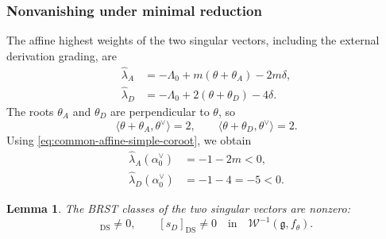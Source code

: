 \documentclass[11pt,reqno]{amsart}
\newtheorem{lemma}[theorem]{Lemma}
\theoremstyle{definition}
\theoremstyle{remark}
\begin{document}
\subsubsection{Nonvanishing under minimal reduction}


The affine highest weights of the two singular vectors, including the
external derivation grading, are
\begin{equation*}
\begin{aligned}
  \widehat\lambda_A
  &=
  -\Lambda_0
  +
  m(\theta+\theta_A)
  -
  2m\delta,\\
  \widehat\lambda_D
  &=
  -\Lambda_0
  +
  2(\theta+\theta_D)
  -
  4\delta.
\end{aligned}
\end{equation*}
The roots \(\theta_A\) and \(\theta_D\) are perpendicular to
\(\theta\), so
\begin{equation*}
  \langle\theta+\theta_A,\theta^\vee\rangle=2,
  \qquad
  \langle\theta+\theta_D,\theta^\vee\rangle=2.
\end{equation*}
Using \eqref{eq:common-affine-simple-coroot}, we obtain
\begin{equation}
\begin{aligned}
  \widehat\lambda_A(\alpha_0^\vee)
  &=
  -1-2m<0,\\
  \widehat\lambda_D(\alpha_0^\vee)
  &=
  -1-4=-5<0.
\end{aligned}
\label{dl:eq:Dl-two-singular-negative-affine-coordinates}
\end{equation}

\begin{lemma}
\label{dl:lem:Dl-reduced-singular-vectors-nonzero}
The BRST classes of the two singular vectors are nonzero:
\begin{equation*}
  [s_A]_{\mathrm{DS}}\ne0,
  \qquad
  [s_D]_{\mathrm{DS}}\ne0
  \quad\text{in}\quad
  \mathcal W^{-1}(\mathfrak g,f_\theta).
\end{equation*}
\end{lemma}
\end{document}

